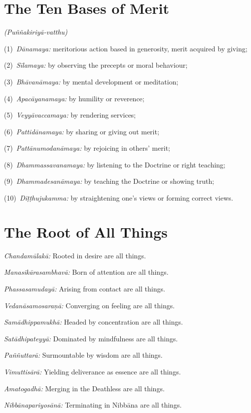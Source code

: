 \ifhandbookedition
\clearpage
\fi

\section*{The Ten Bases of Merit}

\emph{(Puññakiriyā-vatthu)}

(1)~\emph{Dānamaya:} meritorious action based in generosity, merit acquired by giving;

(2)~\emph{Sīlamaya:} by observing the precepts or moral behaviour;

(3)~\emph{Bhāvanāmaya:} by mental development or meditation;

(4)~\emph{Apacāyanamaya:} by humility or reverence;

(5)~\emph{Veyyāvaccamaya:} by rendering services;

(6)~\emph{Pattidānamaya:} by sharing or giving out merit;

(7)~\emph{Pattānumodanāmaya:} by rejoicing in others' merit;

(8)~\emph{Dhammassavanamaya:} by listening to the Doctrine or right teaching;

(9)~\emph{Dhammadesanāmaya:} by teaching the Doctrine or showing truth;

(10)~\emph{Diṭṭhujukamma:} by straightening one's views or forming correct views.

\ifhandbookedition
\clearpage
\fi

\section*{The Root of All Things}

\emph{Chandamūlakā:} Rooted in desire are all things.

\emph{Manasikārasambhavā:} Born of attention are all things.

\emph{Phassasamudayā:} Arising from contact are all things.

\emph{Vedanāsamosaraṇā:} Converging on feeling are all things.

\emph{Samādhippamukhā:} Headed by concentration are all things.

\emph{Satādhipateyyā:} Dominated by mindfulness are all things.

\emph{Paññuttarā:} Surmountable by wisdom are all things.

\emph{Vimuttisārā:} Yielding deliverance as essence are all things.

\emph{Amatogadhā:} Merging in the Deathless are all things.

\emph{Nibbānapariyosānā:} Terminating in Nibbāna are all things.


